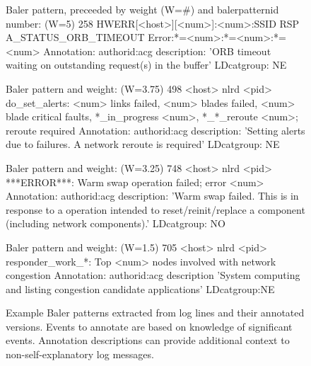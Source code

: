 \begin{figure*}
\begin{annol}

Baler pattern, preceeded by weight (W=#) and balerpatternid number:
(W=5)        258   HWERR[<host>][<num>]:<num>:SSID RSP A_STATUS_ORB_TIMEOUT Error:*=<num>:*=<num>:*=<num>
Annotation:
authorid:acg  description: 'ORB timeout waiting on outstanding request(s) in the buffer'  LDcatgroup: NE

Baler pattern and weight:
(W=3.75)     498   <host> nlrd <pid> do_set_alerts: <num> links failed, <num> blades failed, <num> blade critical faults, *_in_progress <num>, *_*_reroute <num>; reroute required
Annotation:
authorid:acg  description: 'Setting alerts due to failures. A network reroute is required' LDcatgroup: NE

Baler pattern and weight:
(W=3.25)     748   <host> nlrd <pid> ***ERROR***: Warm swap operation failed; error <num>
Annotation:
authorid:acg description: 'Warm swap failed. This is in response to a operation intended to reset/reinit/replace a component (including network components).' LDcatgroup: NO

Baler pattern and weight:
(W=1.5)      705   <host> nlrd <pid> responder_work_*: Top <num> nodes involved with network congestion
Annotation:
authorid:acg description 'System computing and listing congestion candidate applications' LDcatgroup:NE
\end{annol}
\caption{Example Baler patterns extracted from log lines and their annotated versions. Events to annotate are based on
knowledge of significant events. Annotation descriptions can provide additional context to non-self-explanatory log messages.}
\label{f:baler}
\end{figure*}








